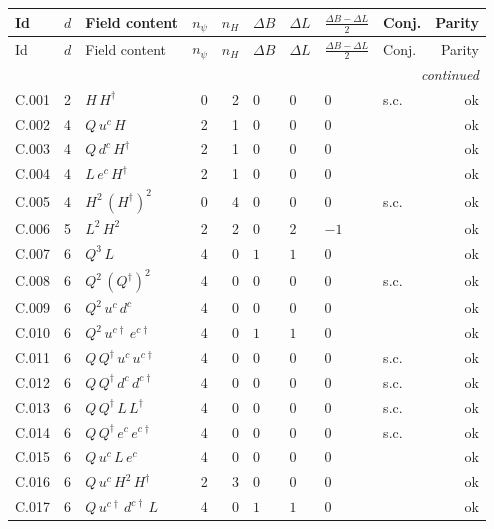 {\scriptsize\setlength{\tabcolsep}{3pt}
\begin{longtable}{@{}ll>{\raggedright\arraybackslash}p{6.4cm}rrllllr@{}}
\toprule
Id & $d$ & Field content & $n_\psi$ & $n_H$ & $\Delta B$ & $\Delta L$ & $\frac{\Delta B-\Delta L}{2}$ & Conj. & Parity \\
\midrule\endfirsthead
\toprule
Id & $d$ & Field content & $n_\psi$ & $n_H$ & $\Delta B$ & $\Delta L$ & $\frac{\Delta B-\Delta L}{2}$ & Conj. & Parity \\
\midrule\endhead
\midrule\multicolumn{10}{r}{\emph{continued}}\\\endfoot
\bottomrule\endlastfoot
C.001 & 2 & $H\,H^\dagger$ & 0 & 2 & $0$ & $0$ & $0$ & s.c. & ok \\
C.002 & 4 & $Q\,u^c\,H$ & 2 & 1 & $0$ & $0$ & $0$ &  & ok \\
C.003 & 4 & $Q\,d^c\,H^\dagger$ & 2 & 1 & $0$ & $0$ & $0$ &  & ok \\
C.004 & 4 & $L\,e^c\,H^\dagger$ & 2 & 1 & $0$ & $0$ & $0$ &  & ok \\
C.005 & 4 & $H^{2}\,(H^\dagger)^{2}$ & 0 & 4 & $0$ & $0$ & $0$ & s.c. & ok \\
C.006 & 5 & $L^{2}\,H^{2}$ & 2 & 2 & $0$ & $2$ & $-1$ &  & ok \\
C.007 & 6 & $Q^{3}\,L$ & 4 & 0 & $1$ & $1$ & $0$ &  & ok \\
C.008 & 6 & $Q^{2}\,(Q^\dagger)^{2}$ & 4 & 0 & $0$ & $0$ & $0$ & s.c. & ok \\
C.009 & 6 & $Q^{2}\,u^c\,d^c$ & 4 & 0 & $0$ & $0$ & $0$ &  & ok \\
C.010 & 6 & $Q^{2}\,u^{c\dagger}\,e^{c\dagger}$ & 4 & 0 & $1$ & $1$ & $0$ &  & ok \\
C.011 & 6 & $Q\,Q^\dagger\,u^c\,u^{c\dagger}$ & 4 & 0 & $0$ & $0$ & $0$ & s.c. & ok \\
C.012 & 6 & $Q\,Q^\dagger\,d^c\,d^{c\dagger}$ & 4 & 0 & $0$ & $0$ & $0$ & s.c. & ok \\
C.013 & 6 & $Q\,Q^\dagger\,L\,L^\dagger$ & 4 & 0 & $0$ & $0$ & $0$ & s.c. & ok \\
C.014 & 6 & $Q\,Q^\dagger\,e^c\,e^{c\dagger}$ & 4 & 0 & $0$ & $0$ & $0$ & s.c. & ok \\
C.015 & 6 & $Q\,u^c\,L\,e^c$ & 4 & 0 & $0$ & $0$ & $0$ &  & ok \\
C.016 & 6 & $Q\,u^c\,H^{2}\,H^\dagger$ & 2 & 3 & $0$ & $0$ & $0$ &  & ok \\
C.017 & 6 & $Q\,u^{c\dagger}\,d^{c\dagger}\,L$ & 4 & 0 & $1$ & $1$ & $0$ &  & ok \\

\end{longtable}}
